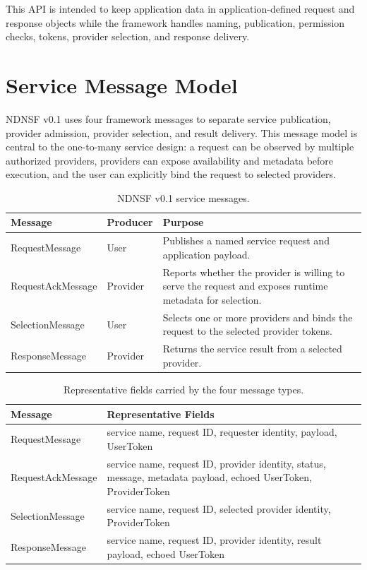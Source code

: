 This API is intended to keep application data in application-defined request
and response objects while the framework handles naming, publication,
permission checks, tokens, provider selection, and response delivery.

\section{Service Message Model}

NDNSF v0.1 uses four framework messages to separate service publication,
provider admission, provider selection, and result delivery. This message model
is central to the one-to-many service design: a request can be observed by
multiple authorized providers, providers can expose availability and metadata
before execution, and the user can explicitly bind the request to selected
providers.

\begin{table}[H]
\centering
\caption{NDNSF v0.1 service messages.}
\label{tab:ndnsf-message-model}
\begin{tabularx}{\textwidth}{p{}p{}X}
\toprule
Message & Producer & Purpose \\
\midrule
RequestMessage & User & Publishes a named service request and application
payload. \\
RequestAckMessage & Provider & Reports whether the provider is willing to
serve the request and exposes runtime metadata for selection. \\
SelectionMessage & User & Selects one or more providers and binds the request
to the selected provider tokens. \\
ResponseMessage & Provider & Returns the service result from a selected
provider. \\
\bottomrule
\end{tabularx}
\end{table}

\begin{table}[H]
\centering
\caption{Representative fields carried by the four message types.}
\label{tab:ndnsf-message-fields}
\begin{tabularx}{\textwidth}{p{}X}
\toprule
Message & Representative Fields \\
\midrule
RequestMessage & service name, request ID, requester identity, payload,
UserToken \\
RequestAckMessage & service name, request ID, provider identity, status,
message, metadata payload, echoed UserToken, ProviderToken \\
SelectionMessage & service name, request ID, selected provider identity,
ProviderToken \\
ResponseMessage & service name, request ID, provider identity, result payload,
echoed UserToken \\
\bottomrule
\end{tabularx}
\end{table}

